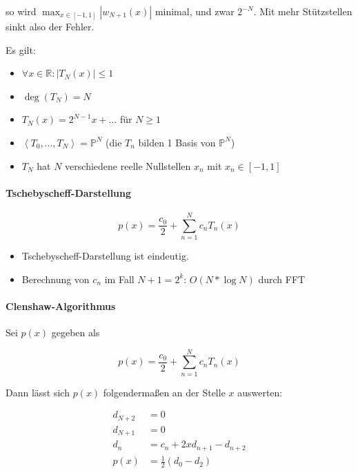 \documentclass[a4paper, 14pt]{article}
\begin{document}
	so wird $\max_{x \in [-1, 1]}{|w_{N + 1}(x)|}$ minimal, und zwar $2^{-N}$.
	Mit mehr Stützstellen sinkt also der Fehler.

	Es gilt:
	
	\begin{itemize}
		\item $\forall x \in \mathbb{R} : |T_N(x)| \leq 1$
		\item $\deg(T_N) = N$
		\item $T_N(x) = 2^{N - 1}x + ...$ für $N \geq 1$
		\item $\left< T_0, ..., T_N \right> = \mathbb{P}^N$ (die $T_n$ bilden 1 Basis von $\mathbb{P}^N$)
		\item $T_N$ hat $N$ verschiedene reelle Nullstellen $x_n$ mit $x_n \in [-1, 1]$
	\end{itemize}

	\paragraph{Tschebyscheff-Darstellung}

	\begin{equation}
		p(x) = \frac{c_0}{2} + \sum_{n = 1}^{N}{c_n T_n(x)}
	\end{equation}

	\begin{itemize}
		\item Tschebyscheff-Darstellung ist eindeutig.
		\item Berechnung von $c_n$ im Fall $N + 1 = 2^k$: $O(N * \log N)$ durch FFT
	\end{itemize}

	\paragraph{Clenshaw-Algorithmus}

	Sei $p(x)$ gegeben als

	\begin{equation}
		p(x) = \frac{c_0}{2} + \sum_{n = 1}^{N}{c_n T_n(x)}
	\end{equation}

	Dann lässt sich $p(x)$ folgendermaßen an der Stelle $x$ auswerten:

	\begin{align}
		d_{N + 2} & = 0 \\
		d_{N + 1} & = 0 \\
		d_n       & = c_n + 2xd_{n + 1} - d_{n + 2} \\
		p(x)      & = \frac{1}{2} (d_0 - d_2)
	\end{align}
\end{document}
